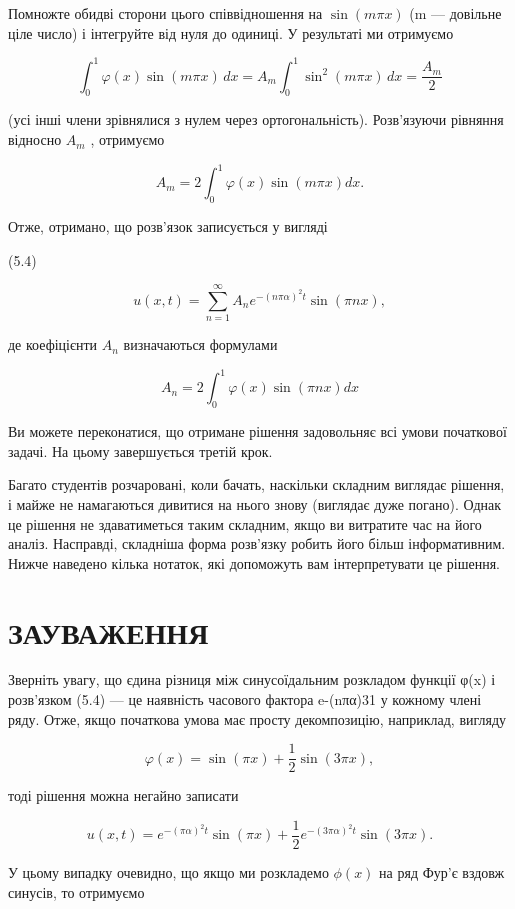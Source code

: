 \documentclass[
  ukrainian,
]{article}
\begin{document}
Помножте обидві сторони цього співвідношення на \(\sin{(m\pi x)}\) (m
--- довільне ціле число) і інтегруйте від нуля до одиниці. У результаті
ми отримуємо

\[
\int_{0}^{1} \varphi(x) \sin(m\pi x) \, dx = A_{m} \int_{0}^{1} \sin^{2}(m\pi x) \, dx = \frac{A_{m}}{2}
\]

(усі інші члени зрівнялися з нулем через ортогональність). Розв'язуючи
рівняння відносно \(A_m\) , отримуємо

\[
A_m = 2 \int_0^1 \varphi(x) \sin(m\pi x) dx.
\]

Отже, отримано, що розв'язок записується у вигляді

(5.4)

\[
u(x, t) = \sum_{n=1}^{\infty} A_n e^{-(n\pi\alpha)^2 t} \sin(\pi n x),
\]

де коефіцієнти \(A_n\) визначаються формулами

\[
A_n = 2\int_0^1 \varphi(x) \sin(\pi nx) dx
\]

Ви можете переконатися, що отримане рішення задовольняє всі умови
початкової задачі. На цьому завершується третій крок.

Багато студентів розчаровані, коли бачать, наскільки складним виглядає
рішення, і майже не намагаються дивитися на нього знову (виглядає дуже
погано). Однак це рішення не здаватиметься таким складним, якщо ви
витратите час на його аналіз. Насправді, складніша форма розв'язку
робить його більш інформативним. Нижче наведено кілька нотаток, які
допоможуть вам інтерпретувати це рішення.

\section{ЗАУВАЖЕННЯ}\label{ux437ux430ux443ux432ux430ux436ux435ux43dux43dux44f-4}

Зверніть увагу, що єдина різниця між синусоїдальним розкладом функції
φ(x) і розв'язком (5.4) --- це наявність часового фактора e-(nπα)31 у
кожному члені ряду. Отже, якщо початкова умова має просту декомпозицію,
наприклад, вигляду

\[
\varphi(x) = \sin(\pi x) + \frac{1}{2}\sin(3\pi x),
\]

тоді рішення можна негайно записати

\[
u(x, t) = e^{-(\pi\alpha)^2 t} \sin(\pi x) + \frac{1}{2} e^{-(3\pi\alpha)^2 t} \sin(3\pi x).
\]

У цьому випадку очевидно, що якщо ми розкладемо \(\phi(x)\) на ряд Фур'є
вздовж синусів, то отримуємо
\end{document}
